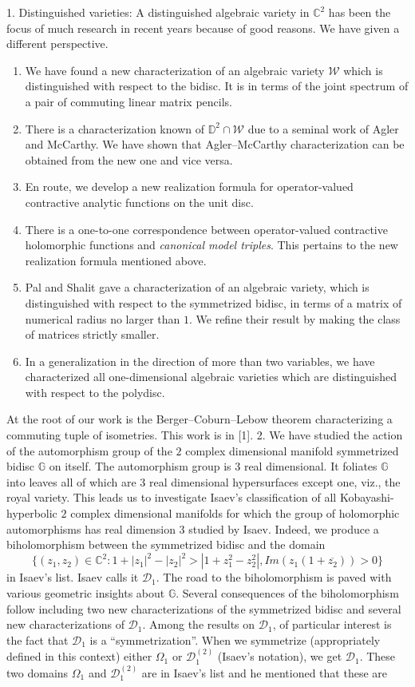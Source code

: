 1. Distinguished varieties:  A distinguished algebraic variety in $\mathbb{C}^2$ has been the focus of much research in recent years because of good reasons. We have given a different perspective.  \begin{enumerate}  \item We have found a new characterization of an algebraic variety $\mathcal W$ which is distinguished with respect to the bidisc. It is in terms of the joint spectrum of a pair of commuting linear matrix pencils.  \item There is a characterization known of $\mathbb{D}^2\cap\mathcal{W}$ due to a seminal work of Agler and McCarthy. We have shown that Agler--McCarthy characterization can be obtained from the new one and vice versa.  \item En route, we develop a new realization formula for operator-valued contractive analytic functions on the unit disc.  \item There is a one-to-one correspondence between operator-valued contractive holomorphic functions and {\em canonical model triples}. This pertains to the new realization formula mentioned above.  \item Pal and Shalit gave a characterization of an algebraic variety, which is distinguished with respect to the symmetrized bidisc, in terms of a matrix of numerical radius no larger than $1$. We refine their result by making the class of matrices strictly smaller.  \item In a generalization in the direction of more than two variables, we have characterized all one-dimensional algebraic  varieties which are distinguished  with respect to the polydisc. \end{enumerate} At the root of our work is the Berger--Coburn--Lebow theorem characterizing a commuting tuple of isometries. This work is in [1].  2. We have studied the action of the automorphism group of the $2$ complex dimensional manifold symmetrized bidisc $\mathbb G$ on itself. The automorphism group is $3$ real dimensional. It foliates $\mathbb G$ into leaves all of which are $3$ real dimensional hypersurfaces except one, viz., the royal variety. This leads us to investigate Isaev's classification of all Kobayashi-hyperbolic $2$ complex dimensional  manifolds for which the group of holomorphic automorphisms has real dimension $3$ studied by Isaev. Indeed, we produce a biholomorphism between the symmetrized bidisc and the domain  \[\{(z_1,z_2)\in \mathbb{C} ^2 : 1+|z_1|^2-|z_2|^2>|1+ z_1 ^2 -z_2 ^2|, Im(z_1 (1+\overline{z_2}))>0\}\]  in Isaev's list. Isaev calls it $\mathcal D_1$. The road to the biholomorphism is paved with various geometric insights about $\mathbb G$.    Several consequences of the biholomorphism follow including two new characterizations of the symmetrized bidisc and several new characterizations of $\mathcal D_1$. Among the results on $\mathcal D_1$, of particular interest is the fact that $\mathcal D_1$ is a ``symmetrization''. When we symmetrize (appropriately defined in this context) either $\Omega_1$ or $\mathcal{D}^{(2)} _1$ (Isaev's notation), we get $\mathcal D_1$.  These two domains $\Omega_1$ and $\mathcal{D}^{(2)} _1$ are in Isaev's list and he mentioned that these are 